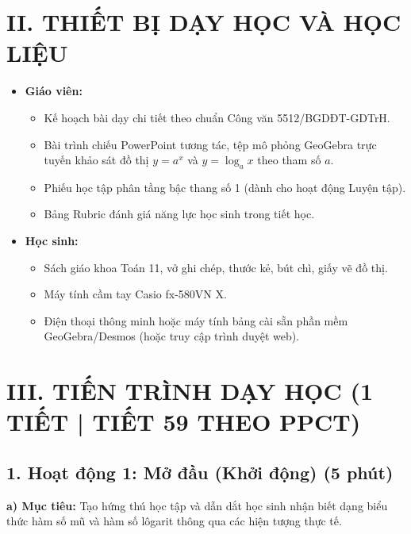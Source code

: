 \documentclass[12pt, a4paper]{article}
\begin{document}
\vspace{5pt}

\section*{II. THIẾT BỊ DẠY HỌC VÀ HỌC LIỆU}

\begin{itemize}[leftmargin=1.2cm]
    \item \textbf{Giáo viên:}
    \begin{itemize}[leftmargin=0.6cm]
        \item Kế hoạch bài dạy chi tiết theo chuẩn Công văn 5512/BGDĐT-GDTrH.
        \item Bài trình chiếu PowerPoint tương tác, tệp mô phỏng GeoGebra trực tuyến khảo sát đồ thị $y = a^x$ và $y = \log_a x$ theo tham số $a$.
        \item Phiếu học tập phân tầng bậc thang số 1 (dành cho hoạt động Luyện tập).
        \item Bảng Rubric đánh giá năng lực học sinh trong tiết học.
    \end{itemize}
    \item \textbf{Học sinh:}
    \begin{itemize}[leftmargin=0.6cm]
        \item Sách giáo khoa Toán 11, vở ghi chép, thước kẻ, bút chì, giấy vẽ đồ thị.
        \item Máy tính cầm tay Casio fx-580VN X.
        \item Điện thoại thông minh hoặc máy tính bảng cài sẵn phần mềm GeoGebra/Desmos (hoặc truy cập trình duyệt web).
    \end{itemize}
\end{itemize}

\vspace{5pt}

\section*{III. TIẾN TRÌNH DẠY HỌC (1 TIẾT | TIẾT 59 THEO PPCT)}

\subsection*{1. Hoạt động 1: Mở đầu (Khởi động) (5 phút)}

\noindent \textbf{a) Mục tiêu:}
Tạo hứng thú học tập và dẫn dắt học sinh nhận biết dạng biểu thức hàm số mũ và hàm số lôgarit thông qua các hiện tượng thực tế.
\end{document}
